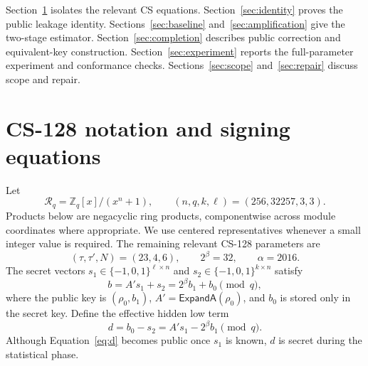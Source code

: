 \documentclass[11pt]{article}
\newcommand{\R}{\mathcal R}
\begin{document}
Section~\ref{sec:scheme} isolates the relevant CS equations.
Section~\ref{sec:identity} proves the public leakage identity.
Sections~\ref{sec:baseline} and~\ref{sec:amplification} give the two-stage estimator.
Section~\ref{sec:completion} describes public correction and equivalent-key construction.
Section~\ref{sec:experiment} reports the full-parameter experiment and conformance checks.
Sections~\ref{sec:scope} and~\ref{sec:repair} discuss scope and repair.

\section{CS-128 notation and signing equations}
\label{sec:scheme}

Let
\[
  \R_q=\mathbb Z_q[x]/(x^n+1),
  \qquad (n,q,k,\ell)=(256,32257,3,3).
\]
Products below are negacyclic ring products, componentwise across module coordinates where
appropriate.  We use centered representatives whenever a small integer value is required.
The remaining relevant CS-128 parameters are
\begin{equation}
  (\tau,\tau',N)=(23,4,6),\qquad 2^\beta=32,\qquad \alpha=2016. \label{eq:params}
\end{equation}
The secret vectors $s_1\in\{-1,0,1\}^{\ell\times n}$ and
$s_2\in\{-1,0,1\}^{k\times n}$ satisfy
\begin{equation}
  b=A's_1+s_2=2^\beta b_1+b_0\pmod q,                  \label{eq:key}
\end{equation}
where the public key is $(\rho_0,b_1)$, $A'=\mathsf{ExpandA}(\rho_0)$, and $b_0$ is
stored only in the secret key.  Define the effective hidden low term
\begin{equation}
  d=b_0-s_2=A's_1-2^\beta b_1\pmod q.                 \label{eq:d}
\end{equation}
Although Equation~\eqref{eq:d} becomes public once $s_1$ is known, $d$ is secret during
the statistical phase.
\end{document}
